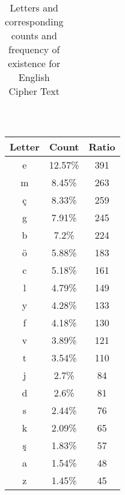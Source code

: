 \documentclass[12pt,a4paper, margin=1in]{article}
\begin{document}
\begin{enumerate}
\begin{enumerate}
\begin{table}[!h]
\begin{tabular}{||c c c||}
                \end{tabular}
                \\
                \caption{Letters and corresponding counts and frequency of existence for English Cipher Text}
            \end{table}
            \newpage
            
            \begin{table}[!h]
            \centering
                \begin{tabular}{||c c c||} 
                 \hline
                 Letter & Count & Ratio \\ [0.5ex] 
                 \hline\hline
                 e & 12.57\% & 391 \\ 
                 \hline
                 m & 8.45\% & 263 \\
                 \hline
                 ç & 8.33\% & 259 \\
                 \hline
                 g & 7.91\% & 245 \\
                 \hline
                 b & 7.2\% & 224 \\ 
                 \hline
                 ö & 5.88\% & 183 \\
                 \hline
                 c & 5.18\% & 161 \\
                 \hline
                 l & 4.79\% & 149 \\
                 \hline
                 y & 4.28\% & 133 \\
                 \hline
                 f & 4.18\% & 130 \\
                 \hline
                 v & 3.89\% & 121 \\
                 \hline
                 t & 3.54\% & 110 \\
                 \hline
                 j & 2.7\% & 84 \\
                 \hline
                 d & 2.6\% & 81 \\
                 \hline
                 s & 2.44\% & 76 \\
                 \hline
                 k & 2.09\% & 65 \\
                 \hline
                 ş & 1.83\% & 57 \\
                 \hline
                 a & 1.54\% & 48 \\
                 \hline
                 z & 1.45\% & 45 \\
                 \hline

\end{tabular}
\end{table}
\end{enumerate}
\end{enumerate}
\end{document}
